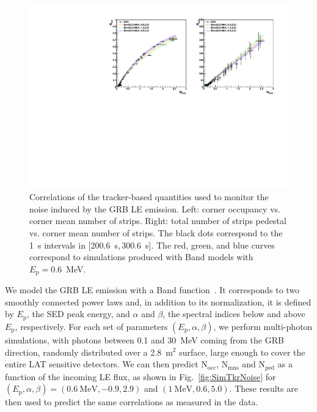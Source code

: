 \documentclass[preprint]{aastex631}
\begin{document}
\begin{figure}[t]
    \centering
    \includegraphics[width=0.9\linewidth]{paper_compcheckTkrNoiseInCornerB-0p2.pdf}
    \caption{Correlations of the tracker-based quantities used to monitor the noise induced by the GRB LE emission. Left: corner occupancy vs. corner mean number of strips. Right: total number of strips pedestal vs. corner mean number of strips. The black dots correspond to the 1~s intervals in [200.6~s,\,300.6~s]. The red, green, and blue curves correspond to simulations produced with Band models with $E_\mathrm{p} = 0.6$~MeV.}
    \label{fig:TkrNoise_correlationB0.6}
\end{figure}

We model the GRB LE emission with a Band function~\citep{1993ApJ...413..281B}. It corresponds to two smoothly connected power laws and, in addition to its normalization, it is defined by $E_\mathrm{p}$, the SED peak energy, and $\alpha$ and $\beta$, the spectral indices below and above $E_\mathrm{p}$, respectively. For each set of parameters $(E_\mathrm{p},\alpha,\beta)$, we perform multi-photon simulations, with photons between 0.1 and 30~MeV coming from the GRB direction, randomly distributed over a 2.8~$\mathrm{m}^2$ surface, large enough to cover the entire LAT sensitive detectors. We can then predict $\mathrm{N}_\mathrm{occ}$, $\mathrm{N}_\mathrm{mns}$ and $\mathrm{N}_\mathrm{ped}$ as a function of the incoming LE flux, as shown in Fig.~\ref{fig:SimTkrNoise} for $(E_\mathrm{p},\alpha,\beta) = (0.6~\mathrm{MeV},-0.9,2.9)$ and $(1~\mathrm{MeV},0.6,5.0)$. These results are then used to predict the same correlations as measured in the data.
\end{document}
